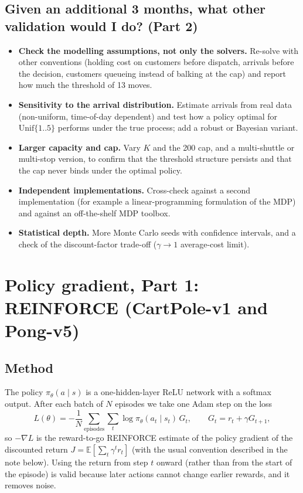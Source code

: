 \documentclass[10pt,a4paper]{article}
\begin{document}
\subsection{Given an additional 3 months, what other validation would I do? (Part 2)}
\begin{itemize}
  \item \textbf{Check the modelling assumptions, not only the solvers.} Re-solve with other conventions (holding cost on customers before
        dispatch, arrivals before the decision, customers queueing instead of balking at the cap) and report how much the threshold of 13 moves.
  \item \textbf{Sensitivity to the arrival distribution.} Estimate arrivals from real data (non-uniform, time-of-day dependent) and test how
        a policy optimal for $\mathrm{Unif}\{1..5\}$ performs under the true process; add a robust or Bayesian variant.
  \item \textbf{Larger capacity and cap.} Vary $K$ and the 200 cap, and a multi-shuttle or multi-stop version, to confirm that the threshold
        structure persists and that the cap never binds under the optimal policy.
  \item \textbf{Independent implementations.} Cross-check against a second implementation (for example a linear-programming formulation of the
        MDP) and against an off-the-shelf MDP toolbox.
  \item \textbf{Statistical depth.} More Monte Carlo seeds with confidence intervals, and a check of the discount-factor trade-off
        ($\gamma\to1$ average-cost limit).
\end{itemize}

\section{Policy gradient, Part 1: REINFORCE (CartPole-v1 and Pong-v5)}

\subsection{Method}
The policy $\pi_\theta(a\mid s)$ is a one-hidden-layer ReLU network with a softmax output. After each batch of $N$ episodes we take one
Adam step on the loss
\[
L(\theta)=-\frac1N\sum_{\text{episodes}}\sum_t \log\pi_\theta(a_t\mid s_t)\,G_t,\qquad G_t=r_t+\gamma G_{t+1},
\]
so $-\nabla L$ is the reward-to-go REINFORCE estimate of the policy gradient of the discounted return
$J=\mathbb E[\sum_t\gamma^t r_t]$ (with the usual convention described in the note below). Using the return from step $t$ onward (rather
than from the start of the episode) is valid because later actions cannot change earlier rewards, and it removes noise.
\end{document}
